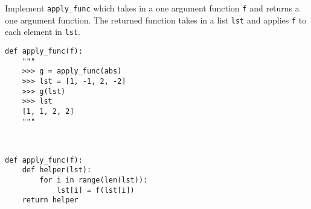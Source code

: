 \begin{blocksection}
\question Implement \lstinline$apply_func$ which takes in a one argument function \lstinline$f$ 
and returns a one argument function. The returned function takes in a list \lstinline$lst$ and applies 
\lstinline$f$ to each element in \lstinline$lst$.

\begin{lstlisting}
def apply_func(f):
    """
    >>> g = apply_func(abs)
    >>> lst = [1, -1, 2, -2]
    >>> g(lst)
    >>> lst
    [1, 1, 2, 2]
    """



\end{lstlisting}

\begin{solution}[1.5in]
\begin{lstlisting}
def apply_func(f):
    def helper(lst):
        for i in range(len(lst)):
            lst[i] = f(lst[i])
    return helper
\end{lstlisting}
\end{solution}
\end{blocksection}